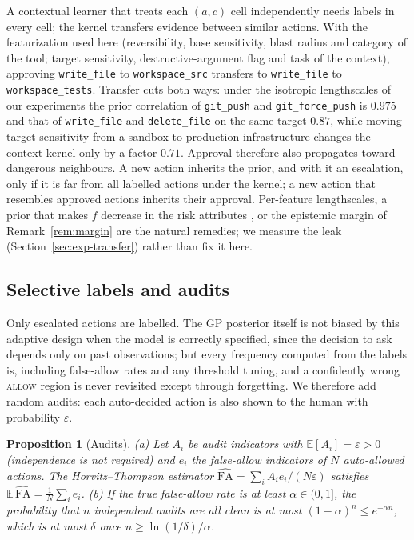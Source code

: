 \documentclass[11pt]{article}
\newtheorem{proposition}{Proposition}
\begin{document}
A contextual learner that treats each $(a,c)$ cell independently needs labels
in every cell; the kernel transfers evidence between similar actions. With the
featurization used here (reversibility, base sensitivity, blast radius and
category of the tool; target sensitivity, destructive-argument flag and task
of the context), approving \texttt{write\_file} to \texttt{workspace\_src}
transfers to \texttt{write\_file} to \texttt{workspace\_tests}. Transfer cuts
both ways: under the isotropic lengthscales of our experiments the prior
correlation of \texttt{git\_push} and \texttt{git\_force\_push} is $0.975$ and
that of \texttt{write\_file} and \texttt{delete\_file} on the same target
$0.87$, while moving target sensitivity from a sandbox to production
infrastructure changes the context kernel only by a factor $0.71$. Approval
therefore also propagates toward dangerous neighbours. A new action inherits
the prior, and with it an escalation, only if it is far from all labelled
actions under the kernel; a new action that resembles approved actions
inherits their approval. Per-feature lengthscales, a prior that makes $f$
decrease in the risk attributes \citep{riihimaki2010gaussian}, or the
epistemic margin of Remark~\ref{rem:margin} are the natural remedies; we
measure the leak (Section~\ref{sec:exp-transfer}) rather than fix it here.

\subsection{Selective labels and audits}\label{sec:audit}

Only escalated actions are labelled. The GP posterior itself is not biased by
this adaptive design when the model is correctly specified, since the
decision to ask depends only on past observations; but every frequency
computed from the labels is, including false-allow rates and any threshold
tuning, and a confidently wrong \textsc{allow} region is never revisited
except through forgetting. We therefore add random audits: each auto-decided
action is also shown to the human with probability $\varepsilon$.

\begin{proposition}[Audits]\label{prop:audit}
(a) Let $A_i$ be audit indicators with $\mathbb E[A_i] = \varepsilon > 0$
(independence is not required) and $e_i$ the false-allow indicators of $N$
auto-allowed actions. The Horvitz--Thompson estimator
$\widehat{\mathrm{FA}} = \sum_i A_i e_i / (N\varepsilon)$ satisfies
$\mathbb E\,\widehat{\mathrm{FA}} = \frac1N\sum_i e_i$.
(b) If the true false-allow rate is at least $\alpha \in (0,1]$, the
probability that $n$ independent audits are all clean is at most
$(1-\alpha)^n \le e^{-\alpha n}$, which is at most $\delta$ once
$n \ge \ln(1/\delta)/\alpha$.
\end{proposition}
\end{document}

